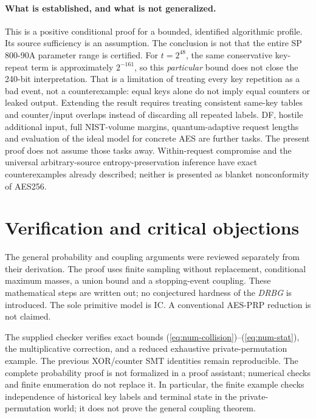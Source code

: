\documentclass[11 pt,a 4 paper]{article}
\begin{document}
\paragraph{What is established, and what is not generalized.} This is a positive conditional proof for a bounded, identified algorithmic profile. Its source sufficiency is an assumption. The conclusion is not that the entire SP 800-90A parameter range is certified. For $ t=2^{48}$, the same conservative key-repeat term is approximately $2^{-161}$, so this \emph{particular} bound does not close the 240-bit interpretation. That is a limitation of treating every key repetition as a bad event, not a counterexample: equal keys alone do not imply equal counters or leaked output. Extending the result requires treating consistent same-key tables and counter/input overlaps instead of discarding all repeated labels. DF, hostile additional input, full NIST-volume margins, quantum-adaptive request lengths and evaluation of the ideal model for concrete AES are further tasks. The present proof does not assume those tasks away. Within-request compromise and the universal arbitrary-source entropy-preservation inference have exact counterexamples already described; neither is presented as blanket nonconformity of AES256.

\appendix
\section{Verification and critical objections}
The general probability and coupling arguments were reviewed separately from their derivation. The proof uses finite sampling without replacement, conditional maximum masses, a union bound and a stopping-event coupling. These mathematical steps are written out; no conjectured hardness of the \emph{DRBG} is introduced. The sole primitive model is IC. A conventional AES-PRP reduction is not claimed.

The supplied checker verifies exact bounds (\ref{eq:num-collision})--(\ref{eq:num-stat}), the multiplicative correction, and a reduced exhaustive private-permutation example. The previous XOR/counter SMT identities remain reproducible. The complete probability proof is not formalized in a proof assistant; numerical checks and finite enumeration do not replace it. In particular, the finite example checks independence of historical key labels and terminal state in the private-permutation world; it does not prove the general coupling theorem.
\end{document}
